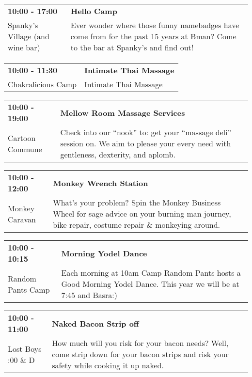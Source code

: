 \begin{tabular}{ p{1in} p{2.2in} }
    \textbf{10:00 - 17:00} & \textbf{Hello Camp} \\
    Spanky's Village (and wine bar) \newline  & Ever wonder where those funny namebadges have come from for the past 15 years at Bman?  Come to the bar at Spanky's and find out! \\
    \hline 
\end{tabular}
    
\begin{tabular}{ p{1in} p{2.2in} }
    \textbf{10:00 - 11:30} & \textbf{Intimate Thai Massage} \\
    Chakralicious Camp \newline  & Intimate Thai Massage \\
    \hline 
\end{tabular}
    
\begin{tabular}{ p{1in} p{2.2in} }
    \textbf{10:00 - 19:00} & \textbf{Mellow Room Massage Services} \\
    Cartoon Commune \newline  & Check into our ``nook'' to: get your ``massage deli'' session on. We aim to please your every need with gentleness, dexterity, and aplomb. \\
    \hline 
\end{tabular}
    
\begin{tabular}{ p{1in} p{2.2in} }
    \textbf{10:00 - 12:00} & \textbf{Monkey Wrench Station} \\
    Monkey Caravan \newline  & What's your problem? Spin the Monkey Business Wheel for sage advice on your burning man journey, bike repair, costume repair \& monkeying around. \\
    \hline 
\end{tabular}
    
\begin{tabular}{ p{1in} p{2.2in} }
    \textbf{10:00 - 10:15} & \textbf{Morning Yodel Dance} \\
    Random Pants Camp \newline  & Each morning at 10am Camp Random Pants hosts a Good Morning Yodel Dance. This year we will be at 7:45 and Basra:) \\
    \hline 
\end{tabular}
    
\begin{tabular}{ p{1in} p{2.2in} }
    \textbf{10:00 - 11:00} & \textbf{Naked Bacon Strip off} \\
    Lost Boys \newline 4:00 \& D & How much will you risk for your bacon needs? Well, come strip down for your bacon strips and risk your safety while cooking it up naked. \\
    \hline 
\end{tabular}
    

